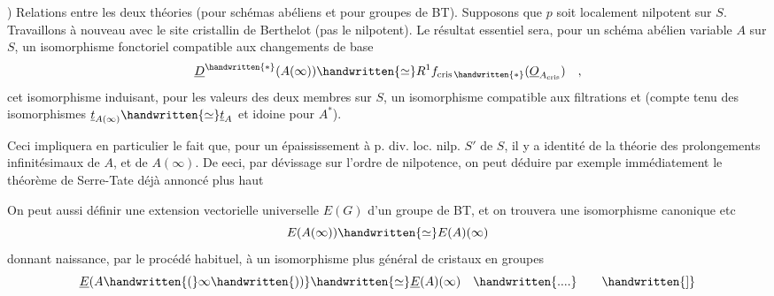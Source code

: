 ) Relations entre les deux théories (pour schémas abéliens et pour
 groupes de BT). Supposons que $p$ soit localement nilpotent sur $S$. Travaillons  à nouveau avec le site cristallin de Berthelot (pas le
nilpotent). Le résultat essentiel sera, pour un schéma abélien variable\deleted{\unsure{,}}
$A$ sur $S$, un isomorphisme fonctoriel compatible aux changements de base
\[
\underline D^{\handwritten{*}}(A(\infty))\handwritten{\simeq} R^{1}f_{\mathrm{cris}\,\handwritten{*}}(\underline O_{A_{\mathrm{cris}}})\quad ,
\]
cet isomorphisme induisant, pour les valeurs des deux membres sur $S$, un
isomorphisme compatible aux filtrations \qquad et \qquad (compte tenu des
isomorphismes $\underline t_{A(\infty)}\handwritten{\simeq}\underline t_A$ et idoine pour $A^{*}$).

Ceci impliquera en particulier le fait que, pour un  épaississement à p. div. loc. nilp.  $S'$ de $S$, il y a identité de la théorie
des prolongements infinitésimaux de $A$, et de $A(\infty)$. De eeci, par dévissage
sur l'ordre de nilpotence, on peut déduire par exemple immédiatement le
théorème de Serre-Tate déjà annoncé plus haut\handwritten{:}

\handwritten{[}On peut aussi définir une extension vectorielle universelle  $E(G)$
d'un groupe de BT, et on trouvera une isomorphisme canonique etc
\[
E(A(\infty))\handwritten{\simeq} E(A)(\infty)
\]
donnant naissance, par le procédé habituel, à un isomorphisme plus
général de cristaux en groupes
\[
\underline E(A\handwritten{(}\infty\handwritten{))}\handwritten{\simeq}\underline E(A)(\infty)\quad\handwritten{....}\qquad\handwritten{]}
\]



